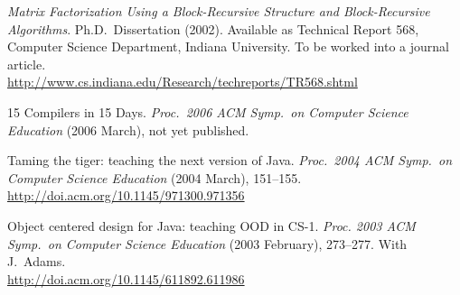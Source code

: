 \documentclass[ComputerScience]{vita}
\newcommand{\duphref}[1]{\href{#1}{#1}}
\begin{document}
\begin{vita}
\begin{Memberships}
\end{Memberships}



% 
% 
% 


\newpage



\begin{Publications}

  \item \textit{Matrix Factorization Using a Block-Recursive Structure and Block-Recursive Algorithms}.  Ph.D.\ Dissertation (2002).  Available as Technical Report 568, Computer Science Department, Indiana University.  To be worked into a journal article.  \\\duphref{http://www.cs.indiana.edu/Research/techreports/TR568.shtml}

  \begin{Papers at Refereed Conferences}
	
	\item 15 Compilers in 15 Days.  \textit{Proc.\ 2006 ACM Symp.\ on Computer Science Education} (2006 March), not yet published.

	\item Taming the tiger: teaching the next version of Java.  \textit{Proc.\ 2004 ACM Symp.\ on Computer Science Education} (2004 March), 151--155.  \\\duphref{http://doi.acm.org/10.1145/971300.971356}


  \item Object centered design for Java: teaching OOD in CS-1. \textit{Proc. 2003 ACM Symp.\ on Computer Science Education} (2003 February), 273--277.  With J.\ Adams.  \\\duphref{http://doi.acm.org/10.1145/611892.611986}


\end{Papers at Refereed Conferences}
\end{Publications}
\end{vita}
\end{document}

